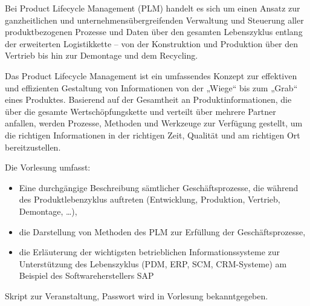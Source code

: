 \begin{course}
\begin{content}
Bei Product Lifecycle Management (PLM) handelt es sich um einen Ansatz zur ganzheitlichen und unternehmensübergreifenden Verwaltung und Steuerung aller produktbezogenen Prozesse und Daten über den gesamten Lebenszyklus entlang der erweiterten Logistikkette – von der Konstruktion und Produktion über den Vertrieb bis hin zur Demontage und dem Recycling.

 

Das Product Lifecycle Management ist ein umfassendes Konzept zur effektiven und effizienten Gestaltung von Informationen von der „Wiege“ bis zum „Grab“ eines Produktes. Basierend auf der Gesamtheit an Produktinformationen, die über die gesamte Wertschöpfungskette und verteilt über mehrere Partner anfallen, werden Prozesse, Methoden und Werkzeuge zur Verfügung gestellt, um die richtigen Informationen in der richtigen Zeit, Qualität und am richtigen Ort bereitzustellen.

 

Die Vorlesung umfasst:

 \begin{itemize}\item Eine durchgängige Beschreibung sämtlicher Geschäftsprozesse, die während des Produktlebenzyklus auftreten (Entwicklung, Produktion, Vertrieb, Demontage, …),  \item die Darstellung von Methoden des PLM zur Erfüllung der Geschäftsprozesse,  \item die Erläuterung der wichtigsten betrieblichen Informationssysteme zur Unterstützung des Lebenszyklus (PDM, ERP, SCM, CRM-Systeme) am Beispiel des Softwareherstellers SAP  \end{itemize}
\end{content}

\begin{media}Skript zur Veranstaltung, Passwort wird in Vorlesung bekanntgegeben.

\end{media}





\end{course}